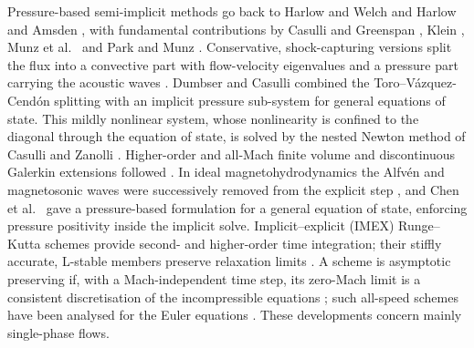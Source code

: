 Pressure-based semi-implicit methods go back to Harlow and Welch \cite{HarlowWelch1965} and Harlow and Amsden
\cite{HarlowAmsden1971}, with fundamental contributions by Casulli and Greenspan \cite{CasulliGreenspan1984}, Klein
\cite{Klein1995}, Munz et al.\ \cite{Munz2003} and Park and Munz \cite{ParkMunz2005}. Conservative, shock-capturing
versions split the flux into a convective part with flow-velocity eigenvalues and a pressure part carrying the acoustic
waves \cite{ZhaBilgen1993,LiouSteffen1993,ToroVazquez2012}. Dumbser and Casulli \cite{DumbserCasulli2016} combined the
Toro--V\'azquez-Cend\'on splitting with an implicit pressure sub-system for general equations of state. This mildly
nonlinear system, whose nonlinearity is confined to the diagonal through the equation of state, is solved by the nested
Newton method of Casulli and Zanolli \cite{CasulliZanolli2012}. Higher-order and all-Mach finite volume and
discontinuous Galerkin extensions followed
\cite{TavelliDumbser2017,Boscheri2020,BoscheriPareschi2021,BoscheriTavelli2022,Boscarino2022,Orlando2022}. In ideal
magnetohydrodynamics the Alfv\'en and magnetosonic waves were successively removed from the explicit step
\cite{Dumbser2019,Fambri2021,BoscheriThomann2024,Dematte2024}, and Chen et al.\ \cite{Chen2026} gave a pressure-based
formulation for a general equation of state, enforcing pressure positivity inside the implicit solve. Implicit--explicit
(IMEX) Runge--Kutta schemes \cite{Ascher1997,PareschiRusso2005} provide second- and higher-order time integration; their
stiffly accurate, L-stable members preserve relaxation limits
\cite{PareschiRusso2005,BoscarinoRusso2009,BoscarinoPareschiRusso2017}. A scheme is asymptotic preserving if, with a
Mach-independent time step, its zero-Mach limit is a consistent discretisation of the incompressible equations
\cite{Jin1999,KlainermanMajda1981}; such all-speed schemes have been analysed for the Euler equations
\cite{DegondTang2011,HaackJinLiu2012,Cordier2012,Noelle2014,Dimarco2018,Boscheri2020}. These developments concern mainly
single-phase flows.

